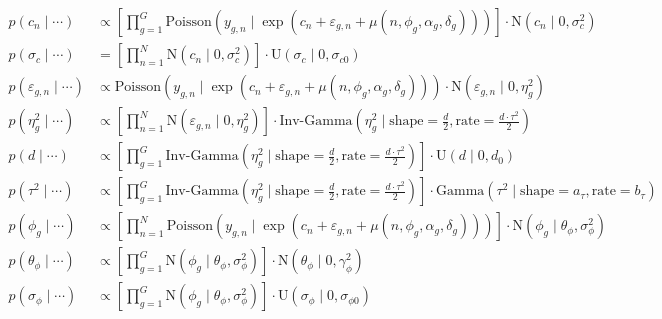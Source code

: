 \documentclass{article}\usepackage{graphicx, color}
\providecommand{\e}{\varepsilon}
\begin{document}
\begin{flushleft}
\begin{align*}
p(c_n \mid \cdots) &\propto \left [ \prod_{g = 1}^G \text{Poisson}(y_{g, n} \mid \exp(c_n + \e_{g, n} + \mu(n, \phi_g, \alpha_g, \delta_g))) \right ] \cdot  \text{N}(c_n \mid 0, \sigma_c^2) \\
p \left (\sigma_c \mid \cdots \right ) &= \left [ \prod_{n = 1}^N \text{N}(c_n \mid 0, \sigma_c^2) \right ] \cdot \text{U}(\sigma_c \mid 0, \sigma_{c0}) \\
p(\e_{g, n} \mid \cdots) &\propto \text{Poisson}(y_{g, n} \mid \exp(c_n + \e_{g, n} + \mu(n, \phi_g, \alpha_g, \delta_g))) \cdot \text{N}(\e_{g, n} \mid 0, \eta_g^2) \\
p(\eta_g^2 \mid \cdots) &\propto \left [ \prod_{n = 1}^N \text{N}(\e_{g, n} \mid 0, \eta_g^2) \right ] \cdot \text{Inv-Gamma} \left ( \eta_g^2 \mid \text{shape} = \frac{d}{2}, \text{rate} = \frac{d \cdot \tau^2}{2} \right ) \\ 
p(d \mid \cdots) &\propto \left [ \prod_{g = 1}^G \text{Inv-Gamma} \left ( \eta_g^2 \mid \text{shape} = \frac{d}{2}, \text{rate} = \frac{d \cdot \tau^2}{2} \right ) \right ] \cdot \text{U}(d \mid 0, d_0) \\ 
p(\tau^2 \mid \cdots) &\propto \left [ \prod_{g = 1}^G \text{Inv-Gamma} \left ( \eta_g^2 \mid \text{shape} = \frac{d}{2}, \text{rate} = \frac{d \cdot \tau^2}{2} \right ) \right ] \cdot \text{Gamma}(\tau^2 \mid \text{shape} = a_\tau, \text{rate} = b_\tau) \\
p(\phi_g \mid \cdots) &\propto \left [ \prod_{n = 1}^N \text{Poisson}(y_{g, n} \mid \exp(c_n + \e_{g, n} + \mu(n, \phi_g, \alpha_g, \delta_g))) \right ] \cdot \text{N}(\phi_g \mid \theta_\phi, \sigma_\phi^2) \\
p(\theta_\phi \mid \cdots ) & \propto \left [ \prod_{g = 1}^G \text{N}( \phi_g \mid \theta_\phi, \sigma_\phi^2) \right ]  \cdot \text{N}(\theta_\phi \mid 0, \gamma_{\phi}^2) \\
p(\sigma_\phi \mid \cdots ) &\propto \left [ \prod_{g = 1}^G \text{N}( \phi_g \mid \theta_\phi, \sigma_\phi^2) \right ] \cdot \text{U}(\sigma_\phi \mid 0, \sigma_{\phi 0}) \\
\end{align*}


\end{flushleft}
\end{document}
